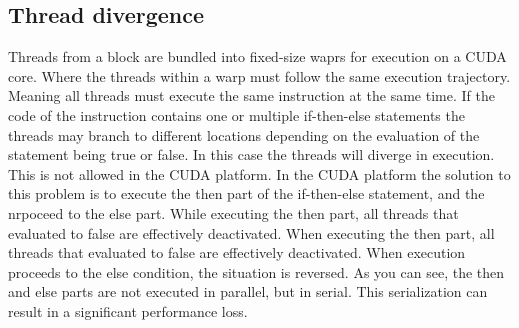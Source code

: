 \documentclass[12pt]{article}
\begin{document}
\subsection{Thread divergence}
Threads from a block are bundled into fixed-size waprs for execution on a CUDA core. Where the threads within a warp must follow the same execution trajectory. Meaning all threads must execute the same instruction at the same time. If the code of the instruction contains one or multiple if-then-else statements the threads may branch to different locations depending on the evaluation of the statement being true or false. In this case the threads will diverge in execution. This is not allowed in the CUDA platform. In the CUDA platform the solution to this problem is to execute the then part of the if-then-else statement, and the nrpoceed to the else part. While executing the then part, all threads that evaluated to false are effectively deactivated. When executing the then part, all threads that evaluated to false are effectively deactivated. When execution proceeds to the else condition, the situation is reversed. As you can see, the then and else parts are not executed in parallel, but in serial. This serialization can result in a significant performance loss.
\end{document}
